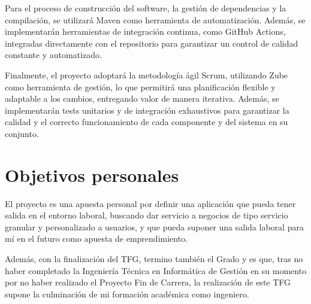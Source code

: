 Para el proceso de construcción del software, la gestión de dependencias y la compilación, se utilizará Maven como herramienta de automatización. Además, se implementarán herramientas de integración continua, como GitHub Actions, integradas directamente con el repositorio para garantizar un control de calidad constante y automatizado.

Finalmente, el proyecto adoptará la metodología ágil Scrum, utilizando Zube como herramienta de gestión, lo que permitirá una planificación flexible y adaptable a los cambios, entregando valor de manera iterativa. Además, se implementarán tests unitarios y de integración exhaustivos para garantizar la calidad y el correcto funcionamiento de cada componente y del sistema en su conjunto.

\section{Objetivos personales}\label{objetivos-personales}
El proyecto es una apuesta personal por definir una aplicación que pueda tener salida en el entorno laboral, buscando dar servicio a negocios de tipo servicio granular y personalizado a usuarios, y que pueda suponer una salida laboral para mí en el futuro como apuesta de emprendimiento.

Además, con la finalización del TFG, termino también el Grado y es que, tras no haber completado la Ingeniería Técnica en Informática de Gestión en su momento por no haber realizado el Proyecto Fin de Carrera, la realización de este TFG supone la culminación de mi formación académica como ingeniero.